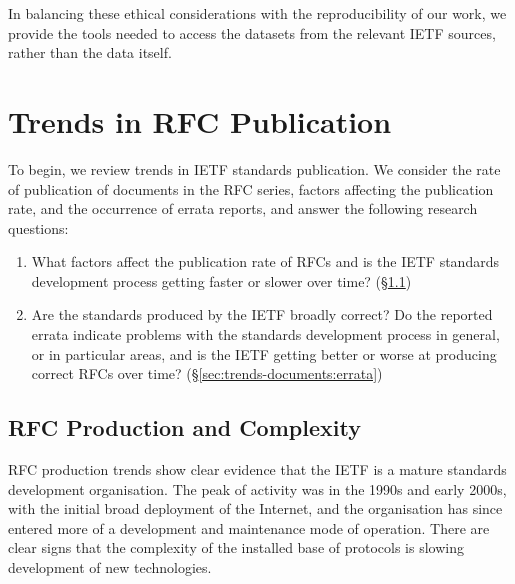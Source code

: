 \documentclass[twocolumn,10pt]{article}
\begin{document}
In balancing these ethical considerations with the reproducibility of our
work, we provide the tools needed to access the datasets from the relevant
IETF sources, rather than the data itself.


\section{Trends in RFC Publication}
\label{sec:trends-documents}


To begin, we review trends in IETF standards publication. We consider the
rate of publication of documents in the RFC series, factors affecting the
publication rate, and the occurrence of errata reports, and answer the
following research questions:
\begin{enumerate}
  \item What factors affect the publication rate of RFCs and is the IETF
    standards development process getting faster or slower over time?
    (\S\ref{sec:trends-documents:production})

  \item Are the standards produced by the IETF broadly correct? Do the
    reported errata indicate problems with the standards development
    process in general, or in particular areas, and is the IETF getting
    better or worse at producing correct RFCs over time?
    (\S\ref{sec:trends-documents:errata})

\end{enumerate}

\subsection{RFC Production and Complexity}
\label{sec:trends-documents:production}

RFC production trends show clear evidence that the IETF is a mature
standards development organisation. The peak of activity was in the 1990s
and early 2000s, with the initial broad deployment of the Internet, and the
organisation has since entered more of a development and maintenance mode
of operation. There are clear signs that the complexity of the installed
base of protocols is slowing development of new technologies.
\end{document}
